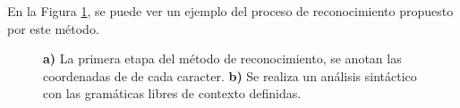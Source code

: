 En la Figura \ref{fig:gramaticas}, se puede ver un ejemplo del proceso de reconocimiento propuesto por este método.

\begin{figure}[h]
    \centering
    \caption{\textbf{a)} La primera etapa del método de reconocimiento, se anotan las coordenadas de de cada caracter. \textbf{b)} Se realiza un análisis sintáctico con las gramáticas libres de contexto definidas.}
    \label{fig:gramaticas}
\end{figure}

\newpage

